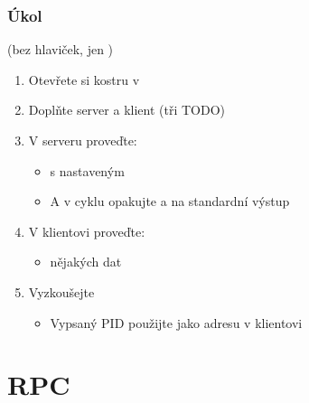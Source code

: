 \begin{frame}
  \frametitle{Úkol}

   (bez hlaviček, jen )
  \begin{enumerate}
    \item Otevřete si kostru v 
    \item Doplňte server a klient (tři TODO)

    \item V serveru proveďte:
    \begin{itemize}
      \item {} s nastaveným 
      \item A v cyklu opakujte  a  na standardní výstup
    \end{itemize}

    \item V klientovi proveďte:
    \begin{itemize}
      \item {} nějakých dat
    \end{itemize}

    \item Vyzkoušejte
    \begin{itemize}
      \item Vypsaný PID použijte jako adresu v klientovi
    \end{itemize}
  \end{enumerate}

\end{frame}

\section{RPC}
\frame{\sectionpage}

